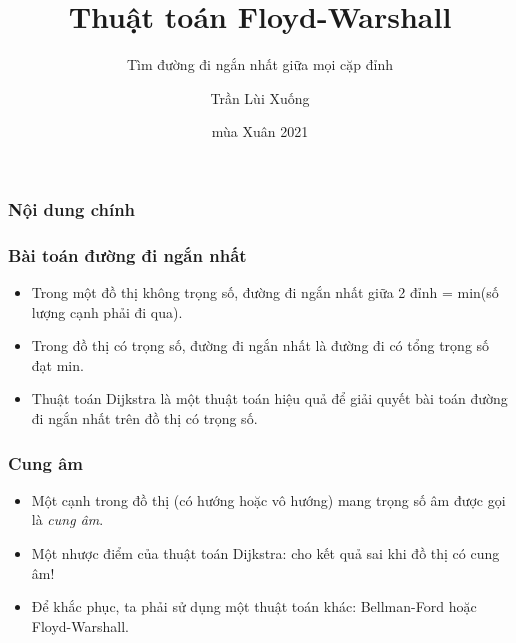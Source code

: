 \documentclass[12pt]{beamer}
\begin{document}
    \author{Trần Lùi Xuống}
    \title{Thuật toán Floyd-Warshall}
    \subtitle{Tìm đường đi ngắn nhất giữa mọi cặp đỉnh}
    \date{mùa Xuân 2021}
    \begin{frame}[plain]
        \maketitle
    \end{frame}

    \begin{frame}
    \frametitle{Nội dung chính}
    \tableofcontents
    \end{frame}

    \begin{frame}
        \frametitle{Bài toán đường đi ngắn nhất}
        \begin{itemize}
            \item Trong một đồ thị không trọng số, đường đi ngắn nhất giữa 2 đỉnh = min(số lượng cạnh phải đi qua).
            \item Trong đồ thị có trọng số, đường đi ngắn nhất là đường đi có tổng trọng số đạt min.
            \item Thuật toán Dijkstra là một thuật toán hiệu quả để giải quyết bài toán đường đi ngắn nhất trên đồ thị có trọng số.
        \end{itemize}
    \end{frame}

    \begin{frame}
        \frametitle{Cung âm}
        \begin{itemize}
            \item Một cạnh trong đồ thị (có hướng hoặc vô hướng) mang trọng số âm được gọi là \textit{cung âm}.
            \item Một nhược điểm của thuật toán Dijkstra: cho kết quả sai khi đồ thị có cung âm!
            \item Để khắc phục, ta phải sử dụng một thuật toán khác: Bellman-Ford hoặc Floyd-Warshall.
        \end{itemize}
    \end{frame}
\end{document}
